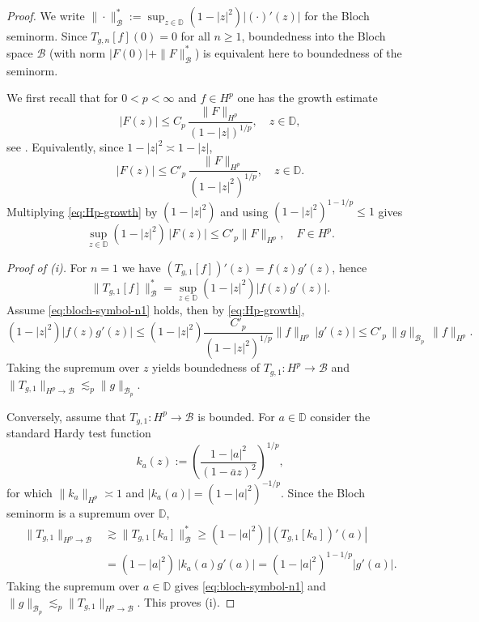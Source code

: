 \documentclass[preprint,12pt]{elsarticle}
\numberwithin{equation}{section}
\theoremstyle{remark}
\begin{document}
\begin{proof}
We write $\|\cdot\|_{\mathcal B}^*:=\sup_{z\in\mathbb D}(1-|z|^2)|(\cdot)'(z)|$ for the Bloch seminorm.
Since $T_{g,n}[f](0)=0$ for all $n\ge1$, boundedness into the Bloch space $\mathcal B$
(with norm $|F(0)|+\|F\|_{\mathcal B}^*$) is equivalent here to boundedness of the seminorm.


We first recall that for $0<p<\infty$ and $f\in H^p$ one has the growth estimate
\begin{equation*}
|F(z)| \le C_p\,\frac{\|F\|_{H^p}}{(1-|z|)^{1/p}},\quad z\in\mathbb D,
\end{equation*}
see \cite[p. 36]{Duren1970}. Equivalently, since $1-|z|^2\asymp 1-|z|$,
\begin{equation}\label{eq:Hp-growth}
|F(z)| \le C'_p\,\frac{\|F\|_{H^p}}{(1-|z|^2)^{1/p}},\quad z\in\mathbb D.
\end{equation}
Multiplying \eqref{eq:Hp-growth} by $(1-|z|^2)$ and using $(1-|z|^2)^{1-1/p}\le 1$ gives
\begin{equation}\label{eq:Hp-to-growth}
\sup_{z\in\mathbb D}(1-|z|^2)\,|F(z)|
\le C'_p\|F\|_{H^p},
\quad F\in H^p.
\end{equation}

\medskip
\noindent\textit{Proof of (i).}
For $n=1$ we have $(T_{g,1}[f])'(z)=f(z)g'(z)$, hence
\begin{equation*}
\|T_{g,1}[f]\|_{\mathcal B}^*
=\sup_{z\in\mathbb D}(1-|z|^2)|f(z)g'(z)|.
\end{equation*}
Assume \eqref{eq:bloch-symbol-n1} holds, then by \eqref{eq:Hp-growth},
\begin{equation*}
(1-|z|^2)|f(z)g'(z)|
\le (1-|z|^2)\frac{C'_p}{(1-|z|^2)^{1/p}}\|f\|_{H^p}\,|g'(z)|
\le C'_p\,\|g\|_{\mathcal B_p}\,\|f\|_{H^p}.
\end{equation*}
Taking the supremum over $z$ yields boundedness of $T_{g,1}:H^p\to\mathcal B$ and
$\|T_{g,1}\|_{H^p\to\mathcal B}\lesssim_p \|g\|_{\mathcal B_p}$.

Conversely, assume that $T_{g,1}:H^p\to\mathcal B$ is bounded. For $a\in\mathbb D$ consider the standard
Hardy test function
\begin{equation}\label{test fun}
k_a(z):=\left(\frac{1-|a|^2}{(1-\overline a z)^2}\right)^{1/p},
\end{equation}
for which $\|k_a\|_{H^p}\asymp 1$ and
$|k_a(a)|=(1-|a|^2)^{-1/p}$. Since the Bloch seminorm is a supremum over $\mathbb D$,
\begin{align*}
\|T_{g,1}\|_{H^p\to\mathcal B}
&\gtrsim
\|T_{g,1}[k_a]\|_{\mathcal B}^*
\ge (1-|a|^2)\,|(T_{g,1}[k_a])'(a)|\\
&=(1-|a|^2)\,|k_a(a)g'(a)|
=(1-|a|^2)^{1-1/p}|g'(a)|.
\end{align*}
Taking the supremum over $a\in\mathbb D$ gives \eqref{eq:bloch-symbol-n1} and
$\|g\|_{\mathcal B_p}\lesssim_p \|T_{g,1}\|_{H^p\to\mathcal B}$.
This proves (i).


\end{proof}
\end{document}
